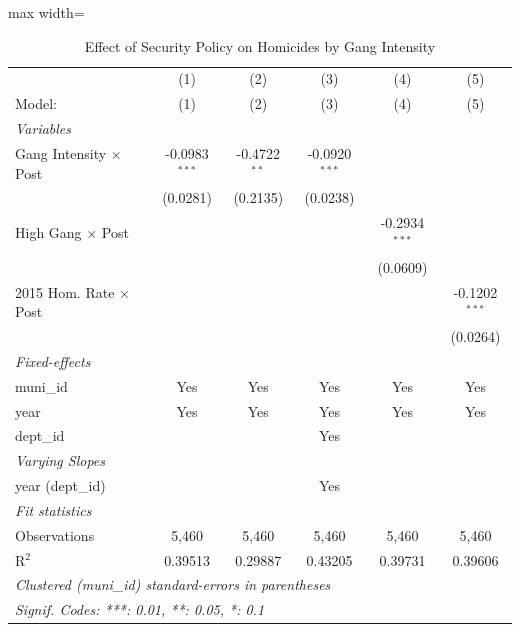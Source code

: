 
\begin{table}[htbp]
   \caption{\label{tab:main} Effect of Security Policy on Homicides by Gang Intensity}
   \centering
   \begin{adjustbox}{max width=\textwidth}
   \begin{tabular}{lccccc}
      \tabularnewline \midrule \midrule
                                    & (1)             & (2)            & (3)             & (4)             & (5) \\   
      Model:                        & (1)             & (2)            & (3)             & (4)             & (5)\\  
      \midrule
      \emph{Variables}\\
      Gang Intensity $\times$ Post  & -0.0983$^{***}$ & -0.4722$^{**}$ & -0.0920$^{***}$ &                 &   \\   
                                    & (0.0281)        & (0.2135)       & (0.0238)        &                 &   \\   
      High Gang $\times$ Post       &                 &                &                 & -0.2934$^{***}$ &   \\   
                                    &                 &                &                 & (0.0609)        &   \\   
      2015 Hom. Rate $\times$ Post  &                 &                &                 &                 & -0.1202$^{***}$\\   
                                    &                 &                &                 &                 & (0.0264)\\   
      \midrule
      \emph{Fixed-effects}\\
      muni\_id                      & Yes             & Yes            & Yes             & Yes             & Yes\\  
      year                          & Yes             & Yes            & Yes             & Yes             & Yes\\  
      dept\_id                      &                 &                & Yes             &                 & \\  
      \midrule
      \emph{Varying Slopes}\\
      year (dept\_id)               &                 &                & Yes             &                 & \\  
      \midrule
      \emph{Fit statistics}\\
      Observations                  & 5,460           & 5,460          & 5,460           & 5,460           & 5,460\\  
      R$^2$                         & 0.39513         & 0.29887        & 0.43205         & 0.39731         & 0.39606\\  
      \midrule \midrule
      \multicolumn{6}{l}{\emph{Clustered (muni\_id) standard-errors in parentheses}}\\
      \multicolumn{6}{l}{\emph{Signif. Codes: ***: 0.01, **: 0.05, *: 0.1}}\\
   \end{tabular}
   \end{adjustbox}


\end{table}

